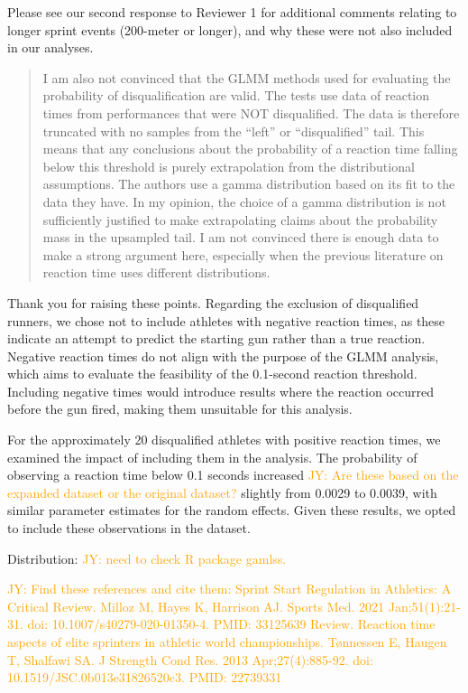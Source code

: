 \documentclass[12pt]{article}
\newcommand{\jy}[1]{\textcolor{orange}{JY: #1}}
\newenvironment{comment}%
{\begin{quotation}\noindent\small\it\color{darkblue}\ignorespaces%
}{\end{quotation}}
\begin{document}
Please see our second response to Reviewer 1 for additional 
comments relating to longer sprint events (200-meter or longer), 
and why these were not also included in our analyses.



\begin{comment}
I am also not convinced that the GLMM methods used for evaluating the
probability of disqualification are valid. The tests use data of reaction times
from performances that were NOT disqualified.  The data is therefore truncated
with no samples from the “left” or “disqualified” tail. This means that any
conclusions about the probability of a reaction time falling below this
threshold is purely extrapolation from the distributional assumptions. The
authors use a gamma distribution based on its fit to the data they have. In my
opinion, the choice of a gamma distribution is not sufficiently justified to
make extrapolating claims about the probability mass in the upsampled tail. I am
not convinced there is enough data to make a strong argument here, especially
when the previous literature on reaction time uses different distributions.
\end{comment}

Thank you for raising these points. Regarding the exclusion of
disqualified runners, we chose not to include athletes with negative
reaction times, as these indicate an attempt to predict the starting
gun rather than a true reaction. Negative reaction times do not align
with the purpose of the GLMM analysis, which aims to evaluate the
feasibility of the 0.1-second reaction threshold. Including negative
times would introduce results where the reaction occurred before the
gun fired, making them unsuitable for this analysis.


For the approximately 20 disqualified athletes with positive reaction
times, we examined the impact of including them in the analysis. The
probability of observing a reaction time below 0.1 seconds increased
\jy{Are these based on the expanded dataset or the original dataset?}
slightly from 0.0029 to 0.0039, with similar parameter estimates for
the random effects. Given these results, we opted to include these
observations in the dataset.


Distribution: \jy{need to check R package gamlss.}


\jy{Find these references and cite them:
Sprint Start Regulation in Athletics: A Critical Review.
Milloz M, Hayes K, Harrison AJ.
Sports Med. 2021 Jan;51(1):21-31. doi: 10.1007/s40279-020-01350-4.
PMID: 33125639 Review.
Reaction time aspects of elite sprinters in athletic world championships.
Tønnessen E, Haugen T, Shalfawi SA.
J Strength Cond Res. 2013 Apr;27(4):885-92. doi: 10.1519/JSC.0b013e31826520c3.
PMID: 22739331
}
\end{document}
